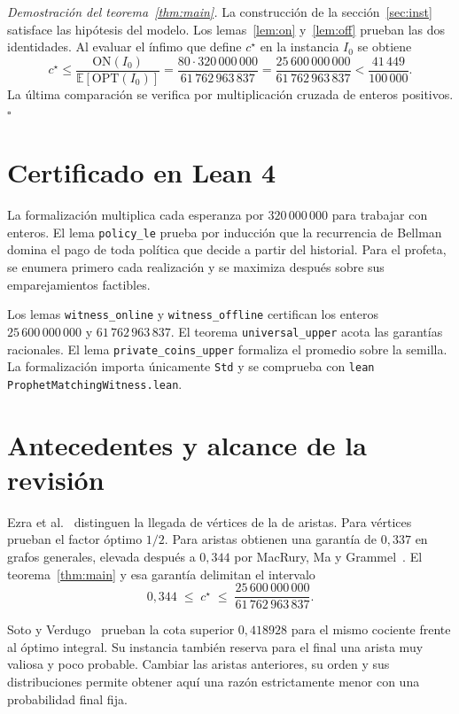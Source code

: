 \documentclass[11pt,a4paper]{article}
\newcommand{\E}{\mathbb{E}}
\newcommand{\OPT}{\mathrm{OPT}}
\newcommand{\numon}{25\,600\,000\,000}
\newcommand{\numoff}{61\,762\,963\,837}
\newcommand{\masa}{320\,000\,000}
\newenvironment{prueba}[1][Demostración]{\par\smallskip\noindent\textit{#1.}\enspace}{\unskip\nobreak\hfill\(\square\)\par\smallskip}
\newcommand{\ON}{\mathrm{ON}}
\begin{document}
\begin{prueba}[Demostración del teorema~\ref{thm:main}]
La construcción de la sección~\ref{sec:inst} satisface las hipótesis del modelo. Los lemas~\ref{lem:on} y~\ref{lem:off} prueban las dos identidades. Al evaluar el ínfimo que define \(c^\star\) en la instancia \(I_0\) se obtiene
\[
 c^\star\leq\frac{\ON(I_0)}{\E[\OPT(I_0)]}
 =\frac{80\cdot\masa}{\numoff}
 =\frac{\numon}{\numoff}<\frac{41\,449}{100\,000}.
\]
La última comparación se verifica por multiplicación cruzada de enteros positivos.
\end{prueba}

\clearpage
\section{Certificado en Lean 4}
La formalización multiplica cada esperanza por \(\masa\) para trabajar con enteros. El lema \texttt{policy\_le} prueba por inducción que la recurrencia de Bellman domina el pago de toda política que decide a partir del historial. Para el profeta, se enumera primero cada realización y se maximiza después sobre sus emparejamientos factibles.

{\raggedright Los lemas \texttt{witness\_online} y \texttt{witness\_offline} certifican los enteros \(\numon\) y \(\numoff\). El teorema \texttt{universal\_upper} acota las garantías racionales. El lema \texttt{private\_coins\_upper} formaliza el promedio sobre la semilla. La formalización importa únicamente \texttt{Std} y se comprueba con \texttt{lean ProphetMatchingWitness.lean}.\par}


\section{Antecedentes y alcance de la revisión}
Ezra et al.~\cite{ezra} distinguen la llegada de vértices de la de aristas. Para vértices prueban el factor óptimo \(1/2\). Para aristas obtienen una garantía de \(0{,}337\) en grafos generales, elevada después a \(0{,}344\) por MacRury, Ma y Grammel~\cite{mmg}. El teorema~\ref{thm:main} y esa garantía delimitan el intervalo
\[
 0{,}344 \;\leq\; c^\star \;\leq\; \frac{\numon}{\numoff}.
\]

Soto y Verdugo~\cite[teorema~1(b)]{sv} prueban la cota superior \(0{,}418928\) para el mismo cociente frente al óptimo integral. Su instancia también reserva para el final una arista muy valiosa y poco probable. Cambiar las aristas anteriores, su orden y sus distribuciones permite obtener aquí una razón estrictamente menor con una probabilidad final fija.
\end{document}
